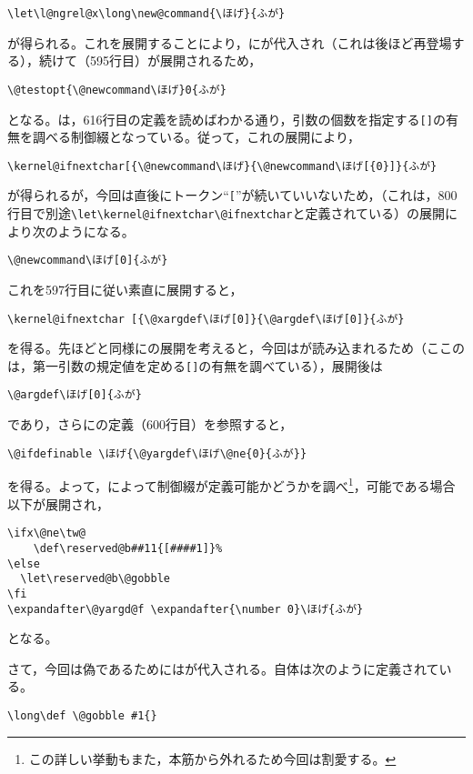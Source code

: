 \documentclass[autodetect-engine,dvipdfmx]{jsarticle}
\begin{document}
\begin{lstlisting}
\let\l@ngrel@x\long\new@command{\ほげ}{ふが}
\end{lstlisting}

が得られる。これを展開することにより，にが代入され（これは後ほど再登場する），続けて（595行目）が展開されるため，

\begin{lstlisting}
\@testopt{\@newcommand\ほげ}0{ふが}
\end{lstlisting}
となる。は，616行目の定義を読めばわかる通り，引数の個数を指定する\texttt{[]}の有無を調べる制御綴となっている。従って，これの展開により，
\begin{lstlisting}
\kernel@ifnextchar[{\@newcommand\ほげ}{\@newcommand\ほげ[{0}]}{ふが}
\end{lstlisting}
が得られるが，今回は直後にトークン``\texttt{[}''が続いていいないため，（これは，800行目で別途\preSub\verb|\let\kernel@ifnextchar\@ifnextchar|と定義されている）の展開により次のようになる。
\begin{lstlisting}
\@newcommand\ほげ[0]{ふが}
\end{lstlisting}
これを597行目に従い素直に展開すると，
\begin{lstlisting}
\kernel@ifnextchar [{\@xargdef\ほげ[0]}{\@argdef\ほげ[0]}{ふが}
\end{lstlisting}
を得る。先ほどと同様にの展開を考えると，今回は\cmd{\@argdef}が読み込まれるため（ここのは，第一引数の規定値を定める\texttt{[]}の有無を調べている），展開後は
\begin{lstlisting}
\@argdef\ほげ[0]{ふが}
\end{lstlisting}
であり，さらにの定義（600行目）を参照すると，
\begin{lstlisting}
\@ifdefinable \ほげ{\@yargdef\ほげ\@ne{0}{ふが}}
\end{lstlisting}
を得る。よって，によって制御綴が定義可能かどうかを調べ\footnote{この詳しい挙動もまた，本筋から外れるため今回は割愛する。}，可能である場合以下が展開され，
\begin{lstlisting}
\ifx\@ne\tw@
    \def\reserved@b##11{[####1]}%
\else
  \let\reserved@b\@gobble
\fi
\expandafter\@yargd@f \expandafter{\number 0}\ほげ{ふが}
\end{lstlisting}
となる。

さて，今回は偽であるためにはが代入される。自体は次のように定義されている。
\latexltx
\begin{lstlisting}[firstnumber=725]
\long\def \@gobble #1{}
\end{lstlisting}
\end{document}
